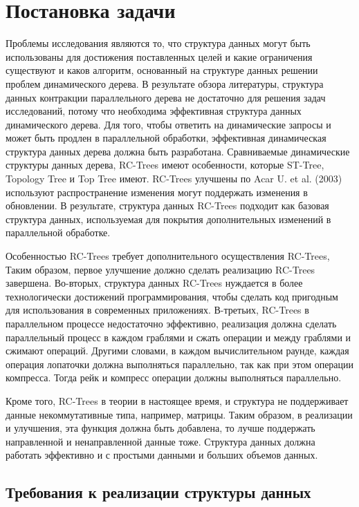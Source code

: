 \documentclass[specification,annotation,times]{itmo-student-thesis}
\newcommand{\revise}[1]{{\color{red!70!black} #1 }}
\begin{document}
\chapter{Постановка задачи}

\revise{
Проблемы исследования являются то, что структура данных могут быть использованы для достижения поставленных целей и какие ограничения существуют и каков алгоритм, основанный на структуре данных решении 
проблем динамического дерева. В результате обзора литературы, структура данных контракции параллельного дерева не достаточно для решения задач исследований, потому что необходима эффективная структура 
данных динамического дерева. Для того, чтобы ответить на динамические запросы и может быть продлен в параллельной обработки, эффективная динамическая структура данных дерева должна быть разработана. 
Сравниваемые динамические структуры данных дерева, RC-Trees имеют особенности, которые ST-Tree, Topology Tree и Top Tree имеют. RC-Trees улучшены по Acar U. et al. (2003) используют распространение 
изменения могут поддержать изменения в обновлении. В результате, структура данных RC-Trees подходит как базовая структура данных, используемая для покрытия дополнительных изменений в параллельной 
обработке.
}

\revise{
Особенностью RC-Trees требует дополнительного осуществления RC-Trees, Таким образом, первое улучшение должно сделать реализацию RC-Trees завершена. Во-вторых, структура данных RC-Trees нуждается в более 
технологически достижений программирования, чтобы сделать код пригодным для использования в современных приложениях. В-третьих, RC-Trees в параллельном процессе недостаточно эффективно, реализация должна 
сделать параллельный процесс в каждом граблями и сжать операции и между граблями и сжимают операций. Другими словами, в каждом вычислительном раунде, каждая операция лопаточки должна выполняться 
параллельно, так как при этом операции компресса. Тогда рейк и компресс операции должны выполняться параллельно.
}

\revise{
Кроме того, RC-Trees в теории в настоящее время, и структура не поддерживает данные некоммутативные типа, например, матрицы. Таким образом, в реализации и улучшения, эта функция должна быть добавлена, то 
лучше поддержать направленной и ненаправленной данные тоже. Структура данных должна работать эффективно и с простыми данными и больших объемов данных.
}

\section{Требования к реализации структуры данных}
\end{document}
